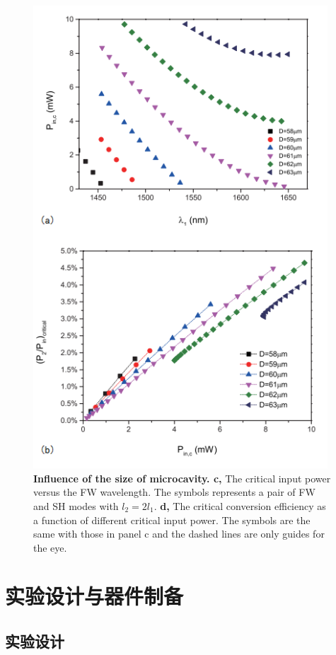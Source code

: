 \documentclass[UTF8,a4paper,cs4size,hyperref]{ctexart}
\begin{document}
\begin{figure}
\includegraphics[width=11cm]{P2change_ed2_aicd}
\centering
\caption{\textbf{Influence of the size of microcavity. c,} The critical input power versus the FW wavelength. The symbols represents a pair of FW and SH modes with $l_2=2l_1$.  \textbf{d, }The critical conversion efficiency as a function of different critical input power. The symbols are the same with those in panel c and the dashed lines are only guides for the eye. }
\label{pic:P2change_ed2_aicd}
\end{figure}

\newpage
\section{实验设计与器件制备}
\label{sec:fab}
\subsection{实验设计}
\label{sec:ExpSetup}
\end{document}
